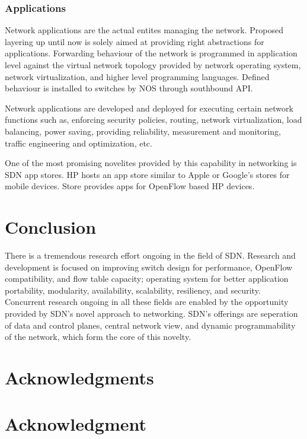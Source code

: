 \documentclass[12pt,journal,compsoc]{IEEEtran}
\begin{document}
\subsubsection{Applications}
 Network applications are the actual entites managing the network. Proposed 
layering up until now is solely aimed at providing right abstractions for 
applications. Forwarding behaviour of the network is programmed in application 
level against the virtual network topology provided by network operating system,
 network virtualization, and higher level programming languages. Defined behaviour 
is installed to switches by NOS through southbound API.

Network applications are developed and deployed for executing 
certain network functions such as, 
enforcing security policies, routing, network virtualization, load balancing,
 power saving, providing reliability, measurement and monitoring,
 traffic engineering and optimization, etc. \cite{kreutz}

One of the most promising novelites provided by this capability in 
networking is SDN app stores. HP hosts an app store similar to Apple or
 Google's stores for mobile devices. Store provides apps for OpenFlow
 based HP devices.
\section{Conclusion}
There is a tremendous research effort ongoing in the field of SDN. Research
 and development is focused on improving switch design for performance, 
OpenFlow compatibility, and flow table capacity; operating system for better
 application portability, modularity, availability, scalability, resiliency, 
and security. Concurrent research ongoing in all these fields are enabled by
 the opportunity provided by SDN's novel approach to networking. SDN's 
offerings are seperation of data and control planes, central network view, and 
dynamic programmability of the network, which form the core of this novelty.

\ifCLASSOPTIONcompsoc
  \section*{Acknowledgments}
\else
  \section*{Acknowledgment}
\fi
\end{document}
